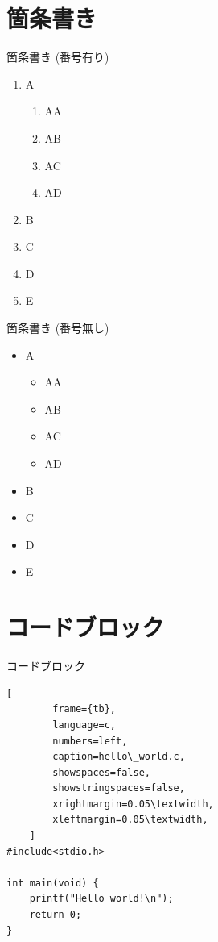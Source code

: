 \documentclass[aspectratio=169]{beamer}
\begin{document}
\section{箇条書き}
\begin{frame}{箇条書き (番号有り)}
    \begin{enumerate}
        \item A
              \begin{enumerate}
                  \item AA
                  \item AB
                  \item AC
                  \item AD
              \end{enumerate}
        \item B
        \item C
        \item D
        \item E
    \end{enumerate}
\end{frame}

\begin{frame}{箇条書き (番号無し)}
    \begin{itemize}
        \item A
              \begin{itemize}
                  \item AA
                  \item AB
                  \item AC
                  \item AD
              \end{itemize}
        \item B
        \item C
        \item D
        \item E
    \end{itemize}
\end{frame}

\section{コードブロック}
\begin{frame}[fragile]{コードブロック}
    \begin{lstlisting}[
        frame={tb},
        language=c,
        numbers=left,
        caption=hello\_world.c,
        showspaces=false,
        showstringspaces=false,
        xrightmargin=0.05\textwidth,
        xleftmargin=0.05\textwidth,
    ]
#include<stdio.h>

int main(void) {
    printf("Hello world!\n");
    return 0;
}
    \end{lstlisting}
\end{frame}
\end{document}
